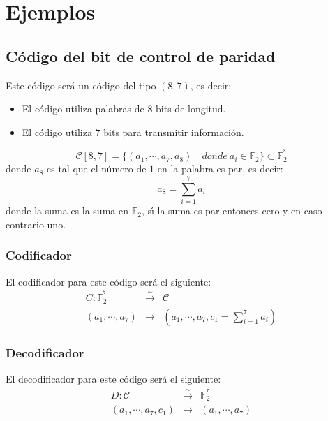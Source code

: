 %
%

\section{Ejemplos}

\subsection{C\'odigo del bit de control de paridad}

Este c\'odigo ser\'a un c\'odigo del tipo $(8,7)$, es decir:
\begin{itemize}
\item El c\'odigo utiliza palabras de $8$ bits de longitud.
\item El c\'odigo utiliza $7$ bits para transmitir informaci\'on.
\end{itemize}
\begin{displaymath}
\mathcal{C}[8,7]=\{(a_1,\cdots,a_7,a_8)\quad donde\ a_i\in \mathbb{F}_2 \}
\subset \mathbb{F}^{^8}_2
\end{displaymath}
donde $a_8$ es tal que el n\'umero de $1$ en la palabra es par, es decir:
\begin{displaymath}
a_8 = \sum_{i=1}^7 a_i
\end{displaymath}
donde la suma es la suma en $\mathbb{F}_2$, s\'{\i} la suma es par
entonces cero y en caso contrario uno.

\subsubsection{Codificador}

El codificador para este c\'odigo ser\'a el siguiente:
\begin{eqnarray*}
C:\mathbb{F}^{^7}_2 &\stackrel{\sim} \longrightarrow & \mathcal{C} \\
(a_1,\cdots,a_7)&\longrightarrow & (a_1,\cdots,a_7,c_1=\sum_{i=1}^7 a_i)
\end{eqnarray*}

\subsubsection{Decodificador}

El decodificador para este c\'odigo ser\'a el siguiente:
\begin{eqnarray*}
D:\mathcal{C}&\stackrel{\sim} \longrightarrow& \mathbb{F}^{^7}_2 \\
(a_1,\cdots,a_7,c_1)&\longrightarrow & (a_1,\cdots,a_7)
\end{eqnarray*}

